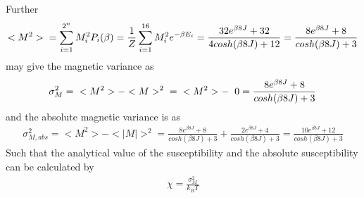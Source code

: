 \documentclass[12pt,english,a4paper]{article}
\begin{document}
Further
\begin{align*}
    <M^2> \hspace{0.2cm} 
          = \sum_{i=1}^{2^n} M_i^2P_i(\beta) 
          = \frac{1}{Z} \sum_{i=1}^{16} M_i^2e^{-\beta E_i}
          = \frac{32e^{\beta 8J} + 32}
                 {4cosh(\beta 8J) + 12}
          = \frac{8e^{\beta 8J} + 8}{cosh(\beta 8J) + 3}
\end{align*}
may give the magnetic variance as
\begin{align*}
    \sigma_M^2 = \hspace{0.2cm} <M^2> - <M>^2 \hspace{0.2cm}
               = \hspace{0.2cm} <M^2> - \hspace{0.2cm} 0
               = \frac{8e^{\beta 8J} + 8}{cosh(\beta 8J) + 3}
\end{align*}
and the absolute magnetic variance is as
\begin{align*}
    \sigma^2_{M,abs} = <M^2> - <|M|>^2 = \frac{8e^{\beta 8J} + 8}{cosh(\beta 8J) + 3}+\frac{2e^{\beta 8J} + 4}{cosh(\beta 8J) + 3}= \frac{10e^{\beta 8J} + 12}{cosh(\beta 8J) + 3}
\end{align*}
Such that the analytical value of the susceptibility and the absolute susceptibility can be calculated by
\begin{align*}
    \chi = \frac{\sigma_M^2}{k_BT}
\end{align*}




\printbibliography
\end{document}
